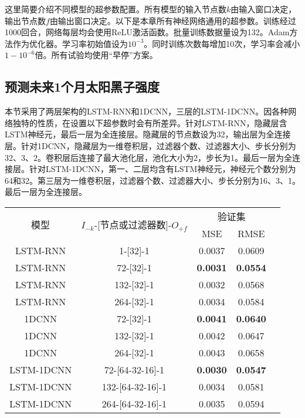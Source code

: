 这里简要介绍不同模型的超参数配置。所有模型的输入节点数$k$由输入窗口决定，输出节点数$f$由输出窗口决定。以下是本章所有神经网络通用的超参数。训练经过1000回合，网络每层均会使用ReLU激活函数。批量训练数据量设为132。Adam方法作为优化器。学习率初始值设为$10^{-3}$。同时训练次数每增加10次，学习率会减小$1-10^{-6}$倍。所有试验均使用“早停”方案。

\subsection{预测未来1个月太阳黑子强度}\label{sec:ss_result_1}

本节采用了两层架构的LSTM-RNN和1DCNN，三层的LSTM-1DCNN。因各种网络独特的性质，在设置以下超参数时会有所差异。针对LSTM-RNN，隐藏层含LSTM神经元，最后一层为全连接层。隐藏层的节点数设为32，输出层为全连接层。针对1DCNN，隐藏层为一维卷积层，过滤器个数、过滤器大小、步长分别为32、3、2。卷积层后连接了最大池化层，池化大小为2，步长为1。最后一层为全连接层。针对LSTM-1DCNN，第一、二层均含有LSTM神经元，神经元个数分别为64和32。第三层为一维卷积层，过滤器个数、过滤器大小、步长分别为16、3、1。最后一层为全连接层。 

\begin{table}[!htbp]
  \centering
  \label{tab:ss_number_out_1}
  \footnotesize
  \renewcommand{\arraystretch}{1}
  \begin{tabular}{ccccc}
    \toprule
    \multirow{2}{*}{模型} & \multirow{2}{*}{$I_{-k}$-[节点或过滤器数]-$O_{+f}$} & \multicolumn{2}{c}{验证集}\\
    \cmidrule(lr){3-4}
    \noalign{\smallskip}
    & & MSE & RMSE\\
    \midrule 
    LSTM-RNN & 1-[32]-1 & 0.0037 & 0.0609 \\
    LSTM-RNN & 72-[32]-1 & \textbf{0.0031} & \textbf{0.0554} \\
    LSTM-RNN & 132-[32]-1 & 0.0032 & 0.0568 \\
    LSTM-RNN & 264-[32]-1 & 0.0034 & 0.0584 \\
    \hline
    1DCNN & 72-[32]-1 & \textbf{0.0041} & \textbf{0.0640} \\
    1DCNN & 132-[32]-1 & 0.0042 & 0.0647 \\
    1DCNN & 264-[32]-1 & 0.0043 & 0.0658 \\
    \hline
    LSTM-1DCNN & 72-[64-32-16]-1 & \textbf{0.0030} & \textbf{0.0547} \\
    LSTM-1DCNN & 132-[64-32-16]-1 & 0.0034 & 0.0581 \\
    LSTM-1DCNN & 264-[64-32-16]-1 & 0.0035 & 0.0594 \\
    \bottomrule
  \end{tabular}
\end{table}

